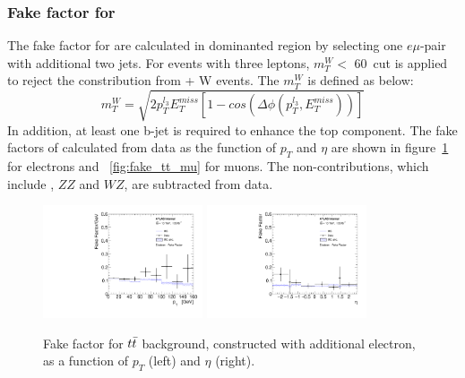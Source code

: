 \subsubsection{Fake factor for \ttbar}

The fake factor for \ttbar are calculated in \ttbar dominanted region by selecting one $e\mu$-pair with additional two jets.
For events with three leptons, $m_{T}^{W} <$ 60~\gev cut is applied to reject the constribution from \ttbar + W events.
The $m_{T}^{W}$ is defined as below:
\begin{equation}
	m_{T}^{W} = \sqrt{ 2p_{T}^{l_{3}} E_{T}^{miss} \left[1-cos\left(\Delta\phi\left(p_{T}^{l_{3}}, E_{T}^{miss}\right)\right)\right] }
\end{equation}
In addition, at least one b-jet is required to enhance the top component.
The fake factors of \ttbar calculated from data as the function of $p_{T}$ and $\eta$ are shown in figure~\ref{fig:fake_tt_el} for electrons and ~\ref{fig:fake_tt_mu} for muons.
The non-\ttbar contributions, which include \Zjet, $ZZ$ and $WZ$, are subtracted from data.
\begin{figure}[!htb]
  \centering
  \includegraphics[width=0.42\textwidth]{figures/VBSZZ/fakebkg/Electron_2Dff_ptttbarFakeFactorAddElectron_etapt_pavgy.pdf}
  \includegraphics[width=0.42\textwidth]{figures/VBSZZ/fakebkg/Electron_2Dff_etattbarFakeFactorAddElectron_etapt_pavgx.pdf}
  \caption{Fake factor for $t\bar{t}$ background, constructed with additional electron, as a function of $p_{T}$ (left) and $\eta$ (right).}
  \label{fig:fake_tt_el}
\end{figure}

